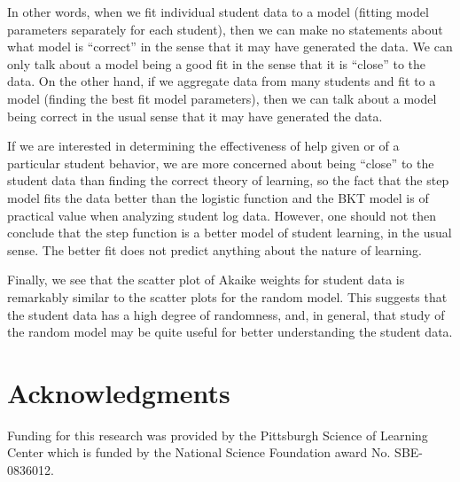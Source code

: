\documentclass{edm_template}
\begin{document}
In other words, when we fit individual student data to a model (fitting
model parameters separately for each student), then we can make no
statements about what model is ``correct'' in the sense that it may
have generated the data.  We can only talk about a model being a good
fit in the sense that it is ``close'' to the data.
On the other hand, if we aggregate data from many students and fit to a
model (finding the best fit model parameters), then we can talk about
a model being correct in the usual sense that it may have generated
the data.  

If we are interested in determining the effectiveness
of help given or of a particular student behavior,
we are more concerned about being ``close'' to
the student data than finding the correct theory of learning, so the
fact that the step model fits the data better than the logistic function and
the BKT model is of practical value when analyzing student log data.  
However, one should not then conclude that the step function is a 
better model of student learning, in the usual sense.  The better fit does
not predict anything about the nature of learning.

Finally, we see that the scatter plot of Akaike weights for student
data is remarkably similar to the scatter plots for the random model.
This suggests that the student data has a high degree of randomness,
and, in general, that study of the random model may be quite useful for better
understanding the student data.

\section{Acknowledgments}

Funding for this research was provided by the Pittsburgh Science of
Learning Center which is funded by the National Science Foundation
award No. SBE-0836012. 

%


\end{document}
